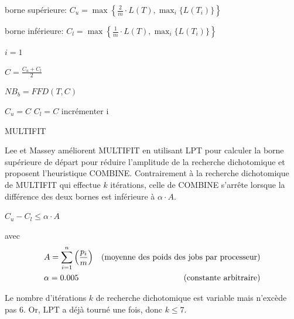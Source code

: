 \documentclass[a4paper,12pt]{report}
\theoremstyle{plain}				%
\theoremstyle{definition}				%
\begin{document}
\bigskip
\begin{algorithm}[H]
\DontPrintSemicolon
{}

\BlankLine %
borne supérieure: 
$C_u = \max\left\{\frac{2}{m} \cdot L(T), \max_i\{L(T_i)\} \right\}$

borne inférieure: 
$C_l = \max\left\{\frac{1}{m} \cdot L(T), \max_i\{L(T_i)\} \right\}$

\BlankLine %
$i=1$

 {
	$C = \frac{C_u + C_l}{2}$
	
	$NB_b = FFD(T,C)$ 
	
	 {
		$C_u = C$
	}
	\Sinon
	{
	 	$C_l = C$
	}
	incrémenter i
}
\BlankLine %


\caption{MULTIFIT}
\label{algo:MULTIFIT}
\end{algorithm}


\bigskip
Lee et Massey \cite{lee1988multiprocessor} améliorent MULTIFIT 
  en utilisant LPT pour 
  calculer la borne supérieure de départ pour réduire l'amplitude de la recherche dichotomique 
  et proposent l'heuristique COMBINE. 
Contrairement à la recherche dichotomique de MULTIFIT 
  qui effectue $k$ itérations, 
  celle de COMBINE s'arrête lorsque 
  la différence des deux bornes est inférieure à $\alpha \cdot A$.
  
$C_u - C_l \leq \alpha \cdot A$

avec  
\begin{align*}
&A = \sum_{i=1}^{n}\left(\frac{p_i}{m}\right)
&\textnormal{(moyenne des poids des jobs par processeur)} \\
&\alpha = 0.005 						
&\textnormal{(constante arbitraire)}
\end{align*}

Le nombre d’itérations $k$ de recherche dichotomique est variable mais n’excède pas 6. 
Or, LPT a déjà tourné une fois, donc $k \leq 7$.
  
\end{document}
